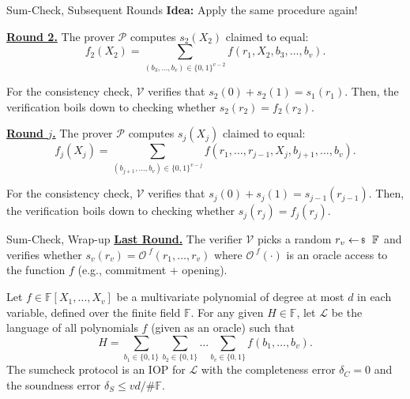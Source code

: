 \documentclass{zkdl-presentation-template}
\begin{document}
    \begin{frame}{Sum-Check, Subsequent Rounds}
        \textbf{Idea:} Apply the same procedure again!\pause

        \underline{\textbf{Round 2.}} The prover $\mathcal{P}$ computes
        $s_2(X_2)$ claimed to equal:
        \begin{equation*}
            f_2(X_2) = \sum_{(b_3,\dots,b_v) \in \{0,1\}^{v-2}}f(r_1,X_2,b_3,\dots,b_v).
        \end{equation*}

        \pause For the consistency check, $\mathcal{V}$ verifies that $s_2(0) + s_2(1)
        = s_1(r_1)$. Then, the verification boils down to checking whether
        $s_2(r_2) = f_2(r_2)$. \pause

        \underline{\textbf{Round $j$.}} The prover $\mathcal{P}$ computes
        $s_j(X_j)$ claimed to equal:
        \begin{equation*}
            f_j(X_j) = \sum_{(b_{j+1},\dots,b_v) \in \{0,1\}^{v-j}}f(r_1,\dots,r_{j-1},X_j,b_{j+1},\dots,b_v).
        \end{equation*}

        \pause For the consistency check, $\mathcal{V}$ verifies that $s_j(0) + s_j(1)
        = s_{j-1}(r_{j-1})$. Then, the verification boils down to checking whether
        $s_j(r_j) = f_j(r_j)$.
    \end{frame}

    \begin{frame}{Sum-Check, Wrap-up}
        \underline{\textbf{Last Round.}} The verifier $\mathcal{V}$ picks a
        random $r_v \leftarrowS \mathbb{F}$ and verifies whether $s_v(r_v) =
        \mathcal{O}^{\; f}(r_1,\dots,r_v)$ where $\mathcal{O}^{\; f}(\cdot)$ is
        an oracle access to the function $f$ (e.g., commitment + opening).\pause

        \begin{lemma}
            Let $f \in \mathbb{F}[X_1,\dots,X_v]$ be a multivariate polynomial of degree
    at most $d$ in each variable, defined over the finite field $\mathbb{F}$.
    For any given $H \in \mathbb{F}$, let $\mathcal{L}$ be the language of 
    all polynomials $f$ (given as an oracle) such that
    \begin{equation*}
        H = \sum_{b_1 \in \{0,1\}}\sum_{b_2 \in \{0,1\}} \dots \sum_{b_v \in \{0,1\}} f(b_1,\dots,b_v).
    \end{equation*}
    The sumcheck protocol is an IOP for $\mathcal{L}$ with the completeness error
    $\delta_C=0$ and the soundness error $\delta_S \leq vd/\#\mathbb{F}$.
        \end{lemma}
    \end{frame}
\end{document}
